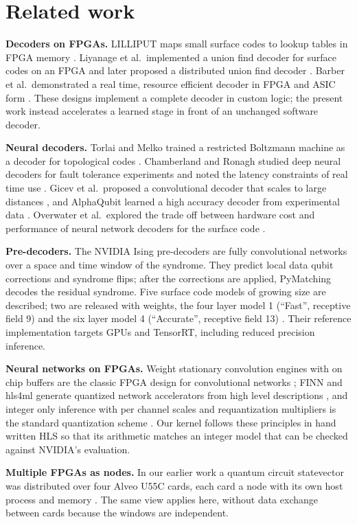 \section{Related work}\label{sec:related}

\textbf{Decoders on FPGAs.} LILLIPUT maps small surface codes to lookup tables in FPGA memory \cite{das2022lilliput}.
Liyanage et al.\ implemented a union find decoder for surface codes on an FPGA and later proposed a
distributed union find decoder \cite{liyanage2023fpga,liyanage2024distributed}. Barber et al.\ demonstrated a real time, resource efficient decoder in
FPGA and ASIC form \cite{barber2025decoder}. These designs implement a complete decoder in custom logic; the present
work instead accelerates a learned stage in front of an unchanged software decoder.

\textbf{Neural decoders.} Torlai and Melko trained a restricted Boltzmann machine as a decoder for topological codes
\cite{torlai2017neural}. Chamberland and Ronagh studied deep neural decoders for fault tolerance experiments and noted
the latency constraints of real time use \cite{chamberland2018deep}. Gicev et al.\ proposed a convolutional decoder
that scales to large distances \cite{gicev2023scalable}, and AlphaQubit learned a high accuracy decoder from
experimental data \cite{bausch2024alphaqubit}. Overwater et al.\ explored the trade off between hardware cost and
performance of neural network decoders for the surface code \cite{overwater2022neural}.

\textbf{Pre-decoders.} The NVIDIA Ising pre-decoders \cite{chamberland2026predecoder} are fully convolutional
networks over a space and time window of the syndrome. They predict local data qubit corrections and syndrome flips;
after the corrections are applied, PyMatching decodes the residual syndrome. Five surface code models of growing size
are described; two are released with weights, the four layer model 1 (``Fast'', receptive field 9) and the six layer
model 4 (``Accurate'', receptive field 13) \cite{nvidia_fast_card,nvidia_accurate_card}. Their reference
implementation targets GPUs and TensorRT, including reduced precision inference.

\textbf{Neural networks on FPGAs.} Weight stationary convolution engines with on chip buffers are the classic FPGA
design for convolutional networks \cite{zhang2015optimizing}; FINN and hls4ml generate quantized network accelerators
from high level descriptions \cite{umuroglu2017finn,duarte2018hls4ml}, and integer only inference with per channel
scales and requantization multipliers is the standard quantization scheme \cite{jacob2018quantization}. Our kernel
follows these principles in hand written HLS \cite{cong2011hls,amd_ug1399} so that its arithmetic matches an integer
model that can be checked against NVIDIA's evaluation.

\textbf{Multiple FPGAs as nodes.} In our earlier work a quantum circuit statevector was distributed over four Alveo
U55C cards, each card a node with its own host process and memory \cite{ali2026multifpga}. The same view applies
here, without data exchange between cards because the windows are independent.
